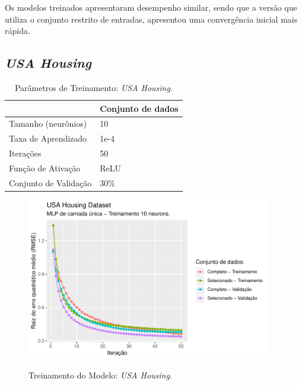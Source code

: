 Os modelos treinados apresentaram desempenho similar, sendo que a versão que utiliza o conjunto restrito de entradas, apresentou uma convergência inicial mais rápida.

\FloatBarrier
\subsection{\textit{USA Housing}}

\begin{table}[!htb]
    \caption{Parâmetros de Treinamento: \textit{USA Housing}.}
    \begin{center}
        \begin{tabular}{@{}ll@{}}
        \toprule
                            & Conjunto de dados \\ \midrule
        Tamanho (neurônios)     & 10                \\
        Taxa de Aprendizado   & 1e-4              \\
        Iterações             & 50                \\
        Função de Ativação    & ReLU              \\
        Conjunto de Validação & $30\%$            \\ \bottomrule
        \end{tabular}
    \end{center}
    \label{tbl:treinamento_housing}
\end{table}

\begin{figure}[!htb]
    \centering
    \caption{Treinamento do Modelo: \textit{USA Housing}.}
    \includegraphics[height=200pt]{imgs/res/USAHousingDataset_model.pdf}
    \label{fig:modelo_USAHousingDataset_model}
\end{figure}

